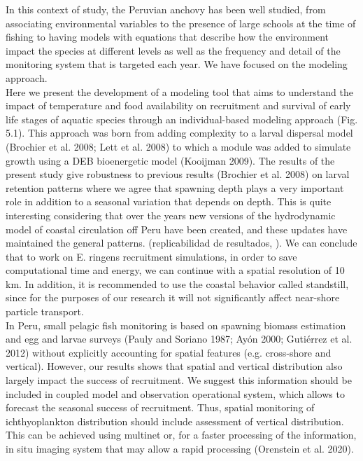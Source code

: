 In this context of study, the Peruvian anchovy has been well studied, from associating environmental variables to the presence of large schools at the time of fishing to having models with equations that describe how the environment impact the species at different levels as well as the frequency and detail of the monitoring system that is targeted each year. We have focused on the modeling approach.\\

Here we present the development of a modeling tool that aims to understand the impact of temperature and food availability on recruitment and survival of early life stages of aquatic species through an individual-based modeling approach (Fig. 5.1). This approach was born from adding complexity to a larval dispersal model (Brochier et al. 2008; Lett et al. 2008) to which a module was added to simulate growth using a DEB bioenergetic model (Kooijman 2009). The results of the present study give robustness to previous results (Brochier et al. 2008) on larval retention patterns where we agree that spawning depth plays a very important role in addition to a seasonal variation that depends on depth. This is quite interesting considering that over the years new versions of the hydrodynamic model of coastal circulation off Peru have been created, and these updates have maintained the general patterns. (replicabilidad de resultados, ). We can conclude that to work on E. ringens recruitment simulations, in order to save computational time and energy, we can continue with a spatial resolution of 10 km. In addition, it is recommended to use the coastal behavior called standstill, since for the purposes of our research it will not significantly affect near-shore particle transport.\\

In Peru, small pelagic fish monitoring is based on spawning biomass estimation and egg and larvae surveys (Pauly and Soriano 1987; Ayón 2000; Gutiérrez et al. 2012) without explicitly accounting for spatial features (e.g. cross-shore and vertical). However, our results shows that spatial and vertical distribution also largely impact the success of recruitment. We suggest this information should be included in coupled model and observation operational system, which allows to forecast the seasonal success of recruitment. Thus, spatial monitoring of ichthyoplankton distribution should include assessment of vertical distribution. This can be achieved using multinet or, for a faster processing of the information, in situ imaging system that may allow a rapid processing (Orenstein et al. 2020).\\


